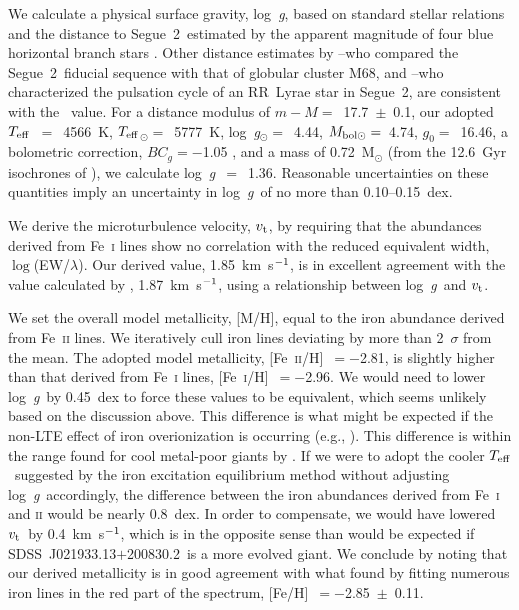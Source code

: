 \documentclass[useAMS,usenatbib,usegraphicx]{mn2e}
\def\kmsec{\mbox{km~s$^{\rm -1}$}}
\def\logg{\mbox{log~{\it g}}}
\def\teff{\mbox{$T_{\rm eff}$}}
\def\vt{\mbox{$v_{\rm t}$}}
\def\logrw{\mbox{$\log$(EW/$\lambda$)}}
\def\seg{\mbox{SDSS~J021933.13$+$200830.2}}
\def\seggal{\mbox{Segue~2}}
\def\gcsixeight{\mbox{M68}}
\begin{document}
We calculate a physical surface gravity, \logg,
based on standard stellar relations and the distance
to \seggal\ estimated by the
apparent magnitude of four blue horizontal branch stars
\citep{belokurov09}.
Other distance estimates by \citet{ripepi12}--who
compared the \seggal\ fiducial sequence with 
that of globular cluster \gcsixeight, and 
\citet{boettcher13}--who characterized the pulsation
cycle of an RR~Lyrae star in \seggal, are
consistent with the \citeauthor{belokurov09}\ value.
For a distance modulus of $m-M =$~17.7~$\pm$~0.1,
our adopted \teff~$=$~4566~K,
\teff$_{\odot} =$~5777~K, 
\logg$_{\odot} =$~4.44,
$M_{\rm bol \odot} =$~4.74,
$g_{0} =$~16.46,
a bolometric correction, $BC_{g} = -$1.05 \citep{girardi04},
and a mass of 0.72~M$_{\odot}$ (from the 
12.6~Gyr isochrones of \citealt{bressan12}),
we calculate \logg~$=$~1.36.
Reasonable uncertainties on these quantities
imply an uncertainty in \logg\ of no more than
0.10--0.15~dex.

We derive the microturbulence velocity, \vt, 
by requiring that the abundances derived from Fe~\textsc{i} lines
show no correlation with the reduced equivalent width,
\logrw.
Our derived value, 1.85~\kmsec, is in excellent agreement
with the value calculated by \citet{kirby13}, 1.87~\kmsec,
using a relationship between \logg\ and \vt.

We set the overall model metallicity, [M/H], 
equal to the iron abundance derived from Fe~\textsc{ii} lines.
We iteratively cull iron lines deviating by more than 
2~$\sigma$ from the mean.
The adopted model metallicity, [Fe~\textsc{ii}/H]~$= -$2.81, is slightly
higher than that derived from Fe~\textsc{i} lines,
[Fe~\textsc{i}/H]~$= -$2.96.
We would need to lower \logg\ by 0.45~dex to
force these values to be equivalent, which seems unlikely
based on the discussion above.
This difference is what might be expected
if the non-LTE effect of iron overionization 
is occurring (e.g., \citealt{thevenin99}).
This difference is within the range found
for cool metal-poor giants by \citet{roederer14}.
If we were to adopt the cooler \teff\ suggested by the
iron excitation equilibrium method without
adjusting \logg\ accordingly, the difference between 
the iron abundances derived from Fe~\textsc{i} and \textsc{ii}
would be nearly 0.8~dex.
In order to compensate, we would have lowered \vt\ by 0.4~\kmsec,
which is in the opposite sense than would be expected if
\seg\ is a more evolved giant.
We conclude by noting that our derived metallicity is in
good agreement with what \citet{kirby13} found by
fitting numerous iron lines in the red part of the spectrum,
[Fe/H]~$= -$2.85~$\pm$~0.11.
\end{document}
